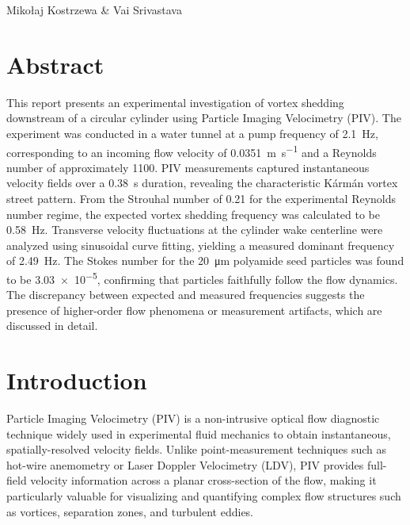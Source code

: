 Mikołaj Kostrzewa \& Vai Srivastava


\pagebreak

\thispagestyle{empty}
\hypertarget{tableofcontents}{\tableofcontents}

\renewcommand{\listfigurename}{Figures}
\listoffigures


\renewcommand{\listlistingname}{Listings}
\listoflistings

\newpage
{}


\section{Abstract} \label{sec:abstract}

This report presents an experimental investigation of vortex shedding downstream of a circular cylinder using Particle Imaging Velocimetry (PIV). The experiment was conducted in a water tunnel at a pump frequency of \SI{2.1}{\hertz}, corresponding to an incoming flow velocity of \SI{0.0351}{\meter\per\second} and a Reynolds number of approximately 1100. PIV measurements captured instantaneous velocity fields over a \SI{0.38}{\second} duration, revealing the characteristic Kármán vortex street pattern. From the Strouhal number of 0.21 for the experimental Reynolds number regime, the expected vortex shedding frequency was calculated to be \SI{0.58}{\hertz}. Transverse velocity fluctuations at the cylinder wake centerline were analyzed using sinusoidal curve fitting, yielding a measured dominant frequency of \SI{2.49}{\hertz}. The Stokes number for the \SI{20}{\micro\meter} polyamide seed particles was found to be \SI{3.03e-5}{}, confirming that particles faithfully follow the flow dynamics. The discrepancy between expected and measured frequencies suggests the presence of higher-order flow phenomena or measurement artifacts, which are discussed in detail.

\section{Introduction} \label{sec:introduction}

Particle Imaging Velocimetry (PIV) is a non-intrusive optical flow diagnostic technique widely used in experimental fluid mechanics to obtain instantaneous, spatially-resolved velocity fields. Unlike point-measurement techniques such as hot-wire anemometry or Laser Doppler Velocimetry (LDV), PIV provides full-field velocity information across a planar cross-section of the flow, making it particularly valuable for visualizing and quantifying complex flow structures such as vortices, separation zones, and turbulent eddies.


